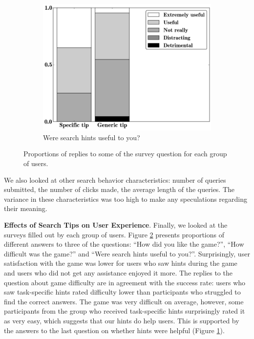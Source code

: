 \begin{figure}[h]
\begin{subfigure}[t]{0.32\textwidth}
    \includegraphics[width=\textwidth]{img/hints_useful}
    \caption{Were search hints useful to you?}
    \label{figure:conversation:hints:survey:useful}
\end{subfigure}
\caption{Proportions of replies to some of the survey question for each group of users.}
\label{figure:conversation:hints:survey}
\end{figure}

We also looked at other search behavior characteristics: number of queries submitted, the number of clicks made, the average length of the queries.
The variance in these characteristics was too high to make any speculations regarding their meaning.

\textbf{Effects of Search Tips on User Experience}.
Finally, we looked at the surveys filled out by each group of users.
Figure \ref{figure:conversation:hints:survey} presents proportions of different answers to three of the questions: ``How did you like the game?'', ``How difficult was the game?'' and ``Were search hints useful to you?''.
Surprisingly, user satisfaction with the game was lower for users who saw hints during the game and users who did not get any assistance enjoyed it more.
The replies to the question about game difficulty are in agreement with the success rate: users who saw task-specific hints rated difficulty lower than participants who struggled to find the correct answers.
The game was very difficult on average, however, some participants from the group who received task-specific hints surprisingly rated it as very easy, which suggests that our hints do help users.
This is supported by the answers to the last question on whether hints were helpful (Figure \ref{figure:conversation:hints:survey:useful}).

